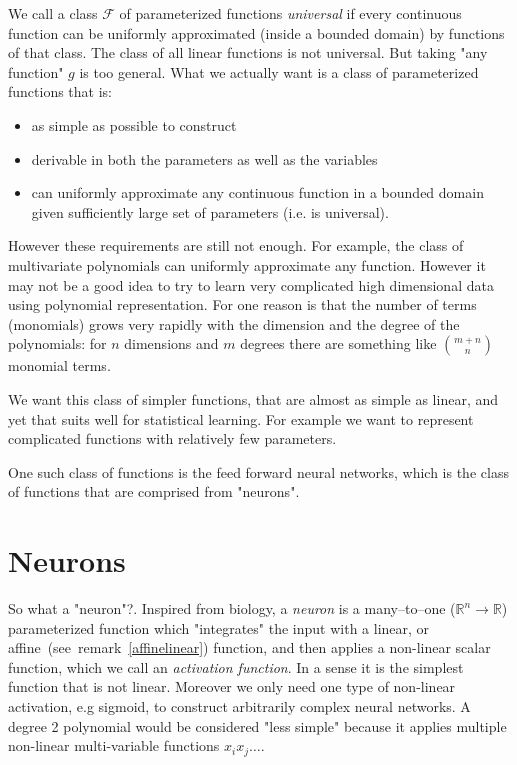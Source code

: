 \documentclass[11pt, a4paper]{report}
\theoremstyle{plain}
\theoremstyle{definition}
\theoremstyle{remark}
\newcommand{\R}{\mathbb{R}}
\begin{document}
We call a class $\mathcal{F}$ of parameterized functions \emph{universal} if
every continuous function can be uniformly approximated (inside a bounded
domain) by functions of that class. The class of all linear functions is not
universal. But taking "any function" $g$ is too general. What we actually want
is a class of parameterized functions that is:
\begin{itemize}
\item{} as simple as possible to construct
\item{} derivable in both the parameters as well as the variables
\item{} can uniformly approximate any continuous function in a bounded domain
given sufficiently large set of
parameters (i.e. is universal).
\end{itemize}

However these requirements are still not enough.
For example, the class of multivariate polynomials can
uniformly approximate any function. However it may not be a good idea to try
to learn very complicated high dimensional data using polynomial representation. 
For one reason is that the number of terms (monomials) grows very rapidly with the
dimension and the degree of the polynomials: for $n$ dimensions and $m$ degrees
there are something like $\binom{m + n}{n}$ monomial terms.

We want this class of simpler functions, that are almost as simple as linear,
and yet that suits well for statistical learning. For example we want to
represent complicated functions with relatively few parameters.

One such class of functions is the feed forward neural networks,
which is the class of functions that are comprised from "neurons".

\section{Neurons}

So what a "neuron"?. 
Inspired from biology, a \emph{neuron} is a many--to--one ($\R^n \to \R$) parameterized
function which
"integrates" the input with a linear, or affine~(see~remark~\ref{affinelinear})
function, and 
then applies a non-linear scalar function, which we call an \emph{activation
function}.
In a sense it is the simplest
function that is not linear.
Moreover we only need one type of non-linear activation, e.g sigmoid, to
construct arbitrarily complex neural networks.
A degree 2 polynomial would be considered "less 
simple" because it applies multiple non-linear multi-variable
functions $x_i x_j\dots$.
\end{document}
